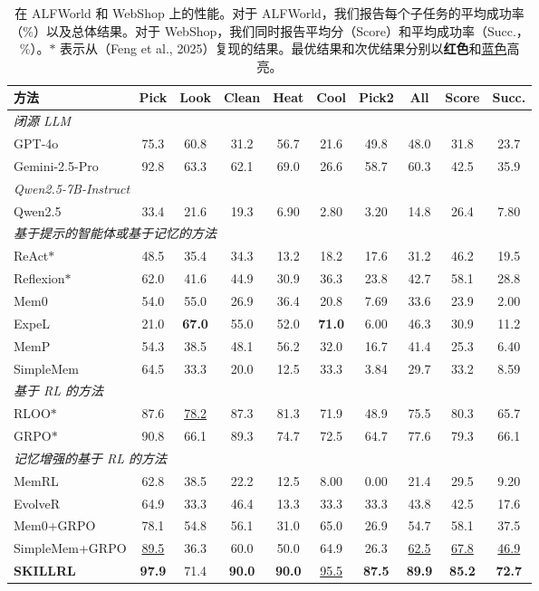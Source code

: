 \documentclass[11pt,UTF8,fontset=fandol]{ctexart}
\newcommand{\best}[1]{\textcolor{best}{\textbf{#1}}}
\newcommand{\sub}[1]{\textcolor{second}{\underline{#1}}}
\begin{document}
\begin{table}[H]\centering
\caption{在 ALFWorld 和 WebShop 上的性能。对于 ALFWorld，我们报告每个子任务的平均成功率（\%）以及总体结果。对于 WebShop，我们同时报告平均分（Score）和平均成功率（Succ.，\%）。$\ast$ 表示从（Feng et al., 2025）复现的结果。最优结果和次优结果分别以\best{红色}和\sub{蓝色}高亮。}
\label{tab:1}
\small
\setlength{\tabcolsep}{4.2pt}
\begin{tabular}{lccccccc cc}
\toprule
方法 & Pick & Look & Clean & Heat & Cool & Pick2 & All & Score & Succ. \\
\midrule
\multicolumn{10}{l}{\textit{闭源 LLM}} \\
GPT-4o & 75.3 & 60.8 & 31.2 & 56.7 & 21.6 & 49.8 & 48.0 & 31.8 & 23.7 \\
Gemini-2.5-Pro & 92.8 & 63.3 & 62.1 & 69.0 & 26.6 & 58.7 & 60.3 & 42.5 & 35.9 \\
\midrule
\multicolumn{10}{l}{\textit{Qwen2.5-7B-Instruct}} \\
Qwen2.5 & 33.4 & 21.6 & 19.3 & 6.90 & 2.80 & 3.20 & 14.8 & 26.4 & 7.80 \\
\midrule
\multicolumn{10}{l}{\textit{基于提示的智能体或基于记忆的方法}} \\
ReAct$\ast$ & 48.5 & 35.4 & 34.3 & 13.2 & 18.2 & 17.6 & 31.2 & 46.2 & 19.5 \\
Reflexion$\ast$ & 62.0 & 41.6 & 44.9 & 30.9 & 36.3 & 23.8 & 42.7 & 58.1 & 28.8 \\
Mem0 & 54.0 & 55.0 & 26.9 & 36.4 & 20.8 & 7.69 & 33.6 & 23.9 & 2.00 \\
ExpeL & 21.0 & \best{67.0} & 55.0 & 52.0 & \best{71.0} & 6.00 & 46.3 & 30.9 & 11.2 \\
MemP & 54.3 & 38.5 & 48.1 & 56.2 & 32.0 & 16.7 & 41.4 & 25.3 & 6.40 \\
SimpleMem & 64.5 & 33.3 & 20.0 & 12.5 & 33.3 & 3.84 & 29.7 & 33.2 & 8.59 \\
\midrule
\multicolumn{10}{l}{\textit{基于 RL 的方法}} \\
RLOO$\ast$ & 87.6 & \sub{78.2} & 87.3 & 81.3 & 71.9 & 48.9 & 75.5 & 80.3 & 65.7 \\
GRPO$\ast$ & 90.8 & 66.1 & 89.3 & 74.7 & 72.5 & 64.7 & 77.6 & 79.3 & 66.1 \\
\midrule
\multicolumn{10}{l}{\textit{记忆增强的基于 RL 的方法}} \\
MemRL & 62.8 & 38.5 & 22.2 & 12.5 & 8.00 & 0.00 & 21.4 & 29.5 & 9.20 \\
EvolveR & 64.9 & 33.3 & 46.4 & 13.3 & 33.3 & 33.3 & 43.8 & 42.5 & 17.6 \\
Mem0+GRPO & 78.1 & 54.8 & 56.1 & 31.0 & 65.0 & 26.9 & 54.7 & 58.1 & 37.5 \\
SimpleMem+GRPO & \sub{89.5} & 36.3 & 60.0 & 50.0 & 64.9 & 26.3 & \sub{62.5} & \sub{67.8} & \sub{46.9} \\
\midrule
\textbf{SKILLRL} & \best{97.9} & 71.4 & \best{90.0} & \best{90.0} & \sub{95.5} & \best{87.5} & \best{89.9} & \best{85.2} & \best{72.7} \\
\bottomrule
\end{tabular}
\end{table}
\end{document}
